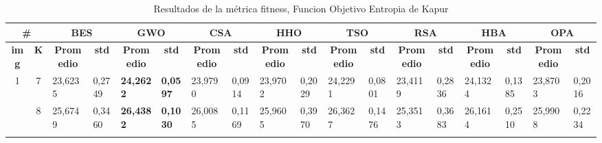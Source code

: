 \documentclass[conference]{IEEEtran}
\begin{document}
\clearpage
\begin{table*}[]
  \caption{Resultados de la métrica fitness, Funcion Objetivo Entropia de Kapur}
	\begin{tabular}{|cc|ll|ll|ll|ll|ll|ll|ll|ll|}
		\hline
		\multicolumn{2}{|c|}{\textbf{\#}}                      & \multicolumn{2}{c|}{\textbf{BES}}                                          & \multicolumn{2}{c|}{\textbf{GWO}}                                          & \multicolumn{2}{c|}{\textbf{CSA}}                                          & \multicolumn{2}{c|}{\textbf{HHO}}                                          & \multicolumn{2}{c|}{\textbf{TSO}}                                          & \multicolumn{2}{c|}{\textbf{RSA}}                                          & \multicolumn{2}{c|}{\textbf{HBA}}                                          & \multicolumn{2}{c|}{\textbf{OPA}}                                          \\ \hline
		\multicolumn{1}{|c|}{\textbf{img}}        & \textbf{K} & \multicolumn{1}{c|}{\textbf{Promedio}} & \multicolumn{1}{c|}{\textbf{std}} & \multicolumn{1}{c|}{\textbf{Promedio}} & \multicolumn{1}{c|}{\textbf{std}} & \multicolumn{1}{c|}{\textbf{Promedio}} & \multicolumn{1}{c|}{\textbf{std}} & \multicolumn{1}{c|}{\textbf{Promedio}} & \multicolumn{1}{c|}{\textbf{std}} & \multicolumn{1}{c|}{\textbf{Promedio}} & \multicolumn{1}{c|}{\textbf{std}} & \multicolumn{1}{c|}{\textbf{Promedio}} & \multicolumn{1}{c|}{\textbf{std}} & \multicolumn{1}{c|}{\textbf{Promedio}} & \multicolumn{1}{c|}{\textbf{std}} & \multicolumn{1}{c|}{\textbf{Promedio}} & \multicolumn{1}{c|}{\textbf{std}} \\ \hline
		\multicolumn{1}{|c|}{\multirow{3}{*}{1}}  & 7          & \multicolumn{1}{l|}{23,6235}           & 0,2749                            & \multicolumn{1}{l|}{\textbf{24,2622}}  & \textbf{0,0597}                   & \multicolumn{1}{l|}{23,9790}           & 0,0914                            & \multicolumn{1}{l|}{23,9702}           & 0,2029                            & \multicolumn{1}{l|}{24,2291}           & 0,0801                            & \multicolumn{1}{l|}{23,4119}           & 0,2836                            & \multicolumn{1}{l|}{24,1324}           & 0,1385                            & \multicolumn{1}{l|}{23,8703}           & 0,2016                            \\ \cline{2-18} 
		\multicolumn{1}{|c|}{}                    & 8          & \multicolumn{1}{l|}{25,6749}           & 0,3460                            & \multicolumn{1}{l|}{\textbf{26,4382}}  & \textbf{0,1030}                   & \multicolumn{1}{l|}{26,0085}           & 0,1169                            & \multicolumn{1}{l|}{25,9605}           & 0,3970                            & \multicolumn{1}{l|}{26,3627}           & 0,1476                            & \multicolumn{1}{l|}{25,3513}           & 0,3683                            & \multicolumn{1}{l|}{26,1614}           & 0,2510                            & \multicolumn{1}{l|}{25,9908}           & 0,2234                            \\ \cline{2-18} 

\end{tabular}
\end{table*}
\end{document}
